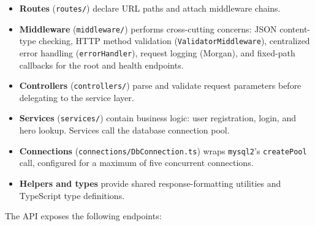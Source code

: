 \begin{itemize}
  \item \textbf{Routes} (\texttt{routes/}) declare URL paths and attach middleware chains.
  \item \textbf{Middleware} (\texttt{middleware/}) performs cross-cutting concerns: JSON content-type checking, HTTP method validation (\texttt{ValidatorMiddleware}), centralized error handling (\texttt{errorHandler}), request logging (Morgan), and fixed-path callbacks for the root and health endpoints.
  \item \textbf{Controllers} (\texttt{controllers/}) parse and validate request parameters before delegating to the service layer.
  \item \textbf{Services} (\texttt{services/}) contain business logic: user registration, login, and hero lookup. Services call the database connection pool.
  \item \textbf{Connections} (\texttt{connections/DbConnection.ts}) wraps \texttt{mysql2}'s \texttt{createPool} call, configured for a maximum of five concurrent connections.
  \item \textbf{Helpers and types} provide shared response-formatting utilities and TypeScript type definitions.
\end{itemize}

The API exposes the following endpoints:

\begin{center}
\end{center}

